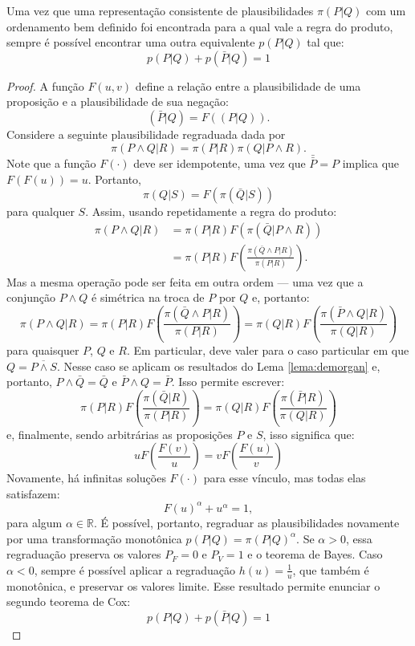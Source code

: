 \begin{Teorema}
 Uma vez que uma representação consistente de plausibilidades $\pi(P|Q)$ com um ordenamento bem definido foi encontrada para a qual vale a regra do produto, sempre é possível encontrar uma outra equivalente $p(P|Q)$ tal que:
 \begin{equation}
 p(P|Q) + p(\bar{P} | Q) = 1 
 \end{equation}
\begin{proof}
A função $F(u,v)$ define a relação entre a plausibilidade de uma proposição e a plausibilidade de sua negação:
\[
  (\bar{P}|Q) = F(({P}|Q)).
\]
Considere a seguinte plausibilidade regraduada dada por \[\pi(P \wedge Q | R) = \pi(P|R) \pi(Q|P \wedge R).\] Note que a função $F(\cdot)$ deve ser idempotente, uma vez que $\bar{\bar{P}} = P$ implica que $F(F(u)) = u$. Portanto, 
\[
\pi(Q|S) = F(\pi(\bar{Q}|S)) 
\]
para qualquer $S$. Assim, usando repetidamente a regra do produto:
\begin{align}
\pi(P\wedge Q | R) &= \pi(P|R) F\left(\pi(\bar{Q}|P\wedge R)\right) \\
&= \pi(P|R) F\left(\frac{\pi(\bar{Q}\wedge P|R)}{\pi(P|R)}\right).
\end{align}
Mas a mesma operação pode ser feita em outra ordem --- uma vez que a conjunção $P\wedge Q$ é simétrica na troca de $P$ por $Q$ e, portanto:
\[
\pi(P\wedge Q | R) = \pi(P|R) F\left(\frac{\pi(\bar{Q}\wedge P|R)}{\pi(P|R)}\right) = \pi(Q|R) F\left(\frac{\pi(\bar{P}\wedge Q|R)}{\pi(Q|R)}\right)
\]
para quaisquer $P$, $Q$ e $R$. Em particular, deve valer para o caso particular em que $Q = \overline{P\wedge S}$. Nesse caso se aplicam os resultados do Lema \ref{lema:demorgan} e, portanto,  $P\wedge\bar{Q} = \bar{Q}$ e $\bar{P}\wedge Q = \bar{P}$. Isso permite escrever:
\[
\pi(P|R) F\left(\frac{\pi(\bar{Q}|R)}{\pi(P|R)}\right) = \pi(Q|R) F\left(\frac{\pi(\bar{P}|R)}{\pi(Q|R)}\right)
\]
e, finalmente, sendo arbitrárias as proposições $P$ e $S$, isso significa que:
\[
u F\left(\frac{F(v)}{u}\right) = v F\left(\frac{F(u)}{v}\right)
\]
Novamente, há infinitas soluções $F(\cdot)$ para esse vínculo, mas todas elas satisfazem\cite{Aczel1975, ACaticha2008}:
\begin{equation}
 F(u)^\alpha + u^\alpha = 1, 
\end{equation}
para algum $\alpha \in \mathbb{R}$. É possível, portanto, regraduar as plausibilidades novamente por uma transformação monotônica $p(P|Q) = \pi(P|Q)^\alpha$. Se $\alpha > 0$, essa regraduação preserva os valores $P_F = 0$ e $P_V = 1$ e o teorema de Bayes. Caso $\alpha<0$, sempre é possível aplicar a regraduação $h(u) = \frac{1}{u}$, que também é monotônica, e preservar os valores limite. Esse resultado permite enunciar o segundo teorema de Cox:
\begin{equation*}
  p(P|Q) + p(\bar{P} | Q) = 1 
\end{equation*}
\end{proof}
\end{Teorema}
